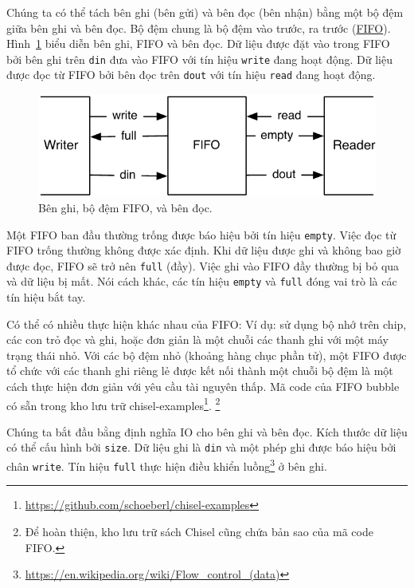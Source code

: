 \documentclass[%
    10pt,
    headinclude, footexclude,
    openright, %
    notitlepage,
    cleardoubleempty,
    headsepline,
    pointlessnumbers,
    bibtotoc, idxtotoc,
    ]{scrbook}
\newcommand{\code}[1]{{\small{\texttt{#1}}}}
\newcommand{\scale}{0.7}
\newcommand{\myref}[2]{\href{#1}{#2}}
\renewcommand{\myref}[2]{{#2}{\footnote{\url{#1}}}}
\begin{document}
Chúng ta có thể tách bên ghi (bên gửi) và bên đọc (bên nhận) bằng một bộ đệm giữa bên ghi và bên đọc. Bộ đệm chung là bộ đệm vào trước, ra trước (\href{https://en.wikipedia.org/wiki/FIFO_%28computing_and_electronics%29}{FIFO}). 
Hình~\ref{fig:fifo} biểu diễn bên ghi, FIFO và bên đọc. Dữ liệu được đặt vào trong FIFO bởi bên ghi trên \code{din} đưa vào FIFO với tín hiệu \code{write} đang hoạt động. Dữ liệu được đọc từ FIFO bởi bên đọc trên \code{dout} với tín hiệu \code{read} đang hoạt động. 

\begin{figure}
  \centering
  \includegraphics[scale=\scale]{figures/fifo}
  \caption{Bên ghi, bộ đệm FIFO, và bên đọc.}
  \label{fig:fifo}
\end{figure}

Một FIFO ban đầu thường trống được báo hiệu bởi tín hiệu \code{empty}. Việc đọc từ FIFO trống thường không được xác định. Khi dữ liệu được ghi và không bao giờ được đọc, FIFO sẽ trở nên \code{full} (đầy). Việc ghi vào FIFO đầy thường bị bỏ qua và dữ liệu bị mất. Nói cách khác, các tín hiệu \code{empty} và \code{full} đóng vai trò là các tín hiệu bắt tay.

Có thể có nhiều thực hiện khác nhau của FIFO: Ví dụ: sử dụng bộ nhớ trên chip, các con trỏ đọc và ghi, hoặc đơn giản là một chuỗi các thanh ghi với một máy trạng thái nhỏ. Với các bộ đệm nhỏ (khoảng hàng chục phần tử), một FIFO được tổ chức với các thanh ghi riêng lẻ được kết nối thành một chuỗi bộ đệm là một cách thực hiện đơn giản với yêu cầu tài nguyên thấp. Mã code của FIFO bubble có sẵn trong kho lưu trữ \myref{https://github.com/schoeberl/chisel-examples}{chisel-examples}. \footnote{Để hoàn thiện, kho lưu trữ sách Chisel cũng chứa bản sao của mã code FIFO.} 

Chúng ta bắt đầu bằng định nghĩa IO cho bên ghi và bên đọc. Kích thước dữ liệu có thể cấu hình bởi \code{size}. Dữ liệu ghi là \code{din} và một phép ghi được báo hiệu bởi chân \code{write}. Tín hiệu \code{full} thực hiện \myref{https://en.wikipedia.org/wiki/Flow_control_(data)}{điều khiển luồng} ở bên ghi.

\end{document}
